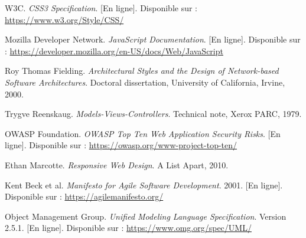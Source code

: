 \begin{thebibliography}{20}
W3C. \textit{CSS3 Specification}. [En ligne]. Disponible sur : \url{https://www.w3.org/Style/CSS/}

Mozilla Developer Network. \textit{JavaScript Documentation}. [En ligne]. Disponible sur : \url{https://developer.mozilla.org/en-US/docs/Web/JavaScript}

Roy Thomas Fielding. \textit{Architectural Styles and the Design of Network-based Software Architectures}. Doctoral dissertation, University of California, Irvine, 2000.

Trygve Reenskaug. \textit{Models-Views-Controllers}. Technical note, Xerox PARC, 1979.

OWASP Foundation. \textit{OWASP Top Ten Web Application Security Risks}. [En ligne]. Disponible sur : \url{https://owasp.org/www-project-top-ten/}

Ethan Marcotte. \textit{Responsive Web Design}. A List Apart, 2010.

Kent Beck et al. \textit{Manifesto for Agile Software Development}. 2001. [En ligne]. Disponible sur : \url{https://agilemanifesto.org/}

Object Management Group. \textit{Unified Modeling Language Specification}. Version 2.5.1. [En ligne]. Disponible sur : \url{https://www.omg.org/spec/UML/}

\end{thebibliography}

\vfill

\newpage